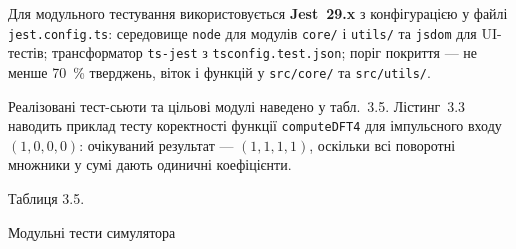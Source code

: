 Для модульного тестування використовується \textbf{Jest~29.x} з
конфігурацією у файлі \texttt{jest.config.ts}: середовище \texttt{node}
для модулів \texttt{core/} і \texttt{utils/} та \texttt{jsdom} для
UI-тестів; трансформатор \texttt{ts-jest} з \texttt{tsconfig.test.json};
поріг покриття --- не менше 70~\% тверджень, віток і функцій у
\texttt{src/core/} та \texttt{src/utils/}.

Реалізовані тест-сьюти та цільові модулі наведено у табл.~3.5.
Лістинг~3.3 наводить приклад тесту коректності функції
\texttt{computeDFT4} для імпульсного входу \((1,0,0,0)\): очікуваний
результат --- \((1,1,1,1)\), оскільки всі поворотні множники у сумі
дають одиничні коефіцієнти.

Таблиця 3.5.

Модульні тести симулятора

